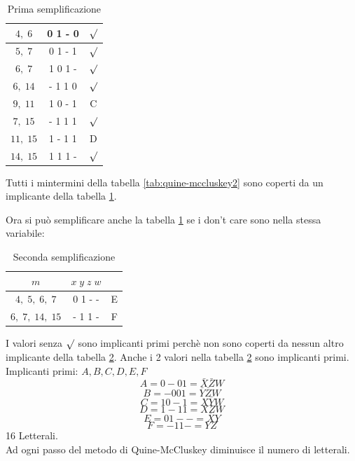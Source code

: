 \documentclass[a4paper]{article}
\theoremstyle{break}
\theoremstyle{break}
\theoremstyle{break}
\theoremstyle{break}
\begin{document}
\begin{example}
\begin{table}[H]
\begin{center}
\begin{tabular}{c|c|c}
               \( 4,\;6 \) & 0 1 - 0 & \(\surd \)\\
               \hline
               \( 5,\;7 \) & 0 1 - 1 & \(\surd \)\\
               \( 6,\;7 \) & 1 0 1 - & \( \surd \)\\
               \( 6,\;14 \) & - 1 1 0 & \( \surd \)\\
               \( 9,\;11 \) & 1 0 - 1 & C \\
               \hline
               \( 7,\;15 \) & - 1 1 1&\(\surd \)\\
               \( 11,\;15 \) & 1 - 1 1 & D \\
               \( 14,\;15 \) & 1 1 1 - & \(\surd \)\\
           \end{tabular}
       \end{center}
       \caption{Prima semplificazione}
       \label{tab:quine-mccluskey3}
   \end{table}
   Tutti i mintermini della tabella \ref{tab:quine-mccluskey2} sono coperti da un implicante
   della tabella \ref{tab:quine-mccluskey3}.

   Ora si può semplificare anche la tabella \ref{tab:quine-mccluskey3} se i don't care
   sono nella stessa variabile:
   \begin{table}[H]
       \begin{center}
           \begin{tabular}{c|c|c}
               \( m \) & \( x\;y\;z\;w \)\\
               \hline
               \( 4,\; 5, \;6, \;7 \) &  0 1 - -  & E \\ 
               \( 6, \;7, \;14, \;15 \) & - 1 1 - & F\\
           \end{tabular}
       \end{center}
        \caption{Seconda semplificazione}
        \label{tab:quine-mccluskey4}
   \end{table}
   I valori senza \( \surd \) sono implicanti primi perchè non sono coperti da nessun altro implicante
   della tabella \ref{tab:quine-mccluskey4}. Anche i 2 valori nella tabella \ref{tab:quine-mccluskey4} sono
   implicanti primi.\\
   Implicanti primi: \( A,B,C,D,E,F \)
   \[
   A=0-01=\bar{X}\bar{Z}W
\]
   \[
       B=-001=\bar{Y}\bar{Z}W
   \]
   \[
       C=10-1=X\bar{Y}W
   \]
   \[
       D=1-11=XZW
   \]
   \[
       E=01--=\bar{X}Y
   \]
   \[
       F=-11-=YZ
   \]
   16 Letterali.\\
Ad ogni passo del metodo di Quine-McCluskey diminuisce il numero di letterali.


\end{example}
\end{document}
